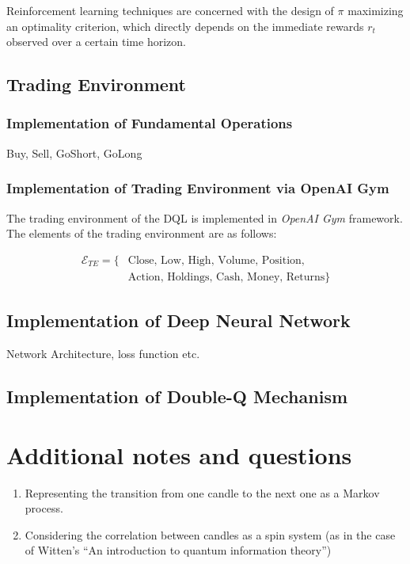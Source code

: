 \documentclass[twocolumn,aps,pra,superscriptaddress,nofootinbib,longbibliography]{revtex4-2}
\begin{document}
Reinforcement learning techniques are concerned with the design of \(\pi\) maximizing an optimality criterion, which directly depends on the immediate rewards \(r_t\) observed over a certain time horizon.  

\subsection{Trading Environment}

\subsubsection{Implementation of Fundamental Operations}

Buy, Sell, GoShort, GoLong

\subsubsection{Implementation of Trading Environment via OpenAI Gym}

The trading environment of the DQL is implemented in \textit{OpenAI Gym} framework. The elements of the trading environment are as follows:

\begin{equation}
    \begin{aligned}
        \mathcal{E}_{TE} = \{&\text{Close, Low, High, Volume, Position,} \\
        &\text{Action, Holdings, Cash, Money, Returns}\}
    \end{aligned}
\end{equation}

\subsection{Implementation of Deep Neural Network}

Network Architecture, loss function etc.

\subsection{Implementation of Double-Q Mechanism}

\section{Additional notes and questions}

\begin{enumerate}
    \item Representing the transition from one candle to the next one as a Markov process.
    \item Considering the correlation between candles as a spin system (as in the case of Witten's ``An introduction to quantum information theory'') 
\end{enumerate}




\clearpage



\end{document}
